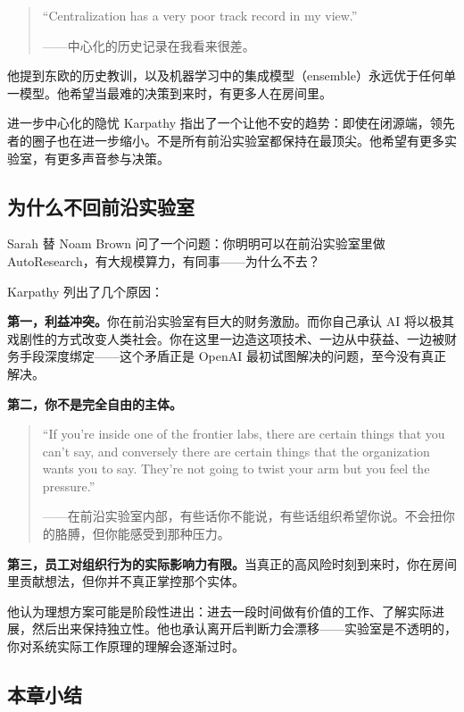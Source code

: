 \documentclass[a4paper]{article}
\begin{document}
\begin{quote}
``Centralization has a very poor track record in my view.''

——中心化的历史记录在我看来很差。
\end{quote}

他提到东欧的历史教训，以及机器学习中的集成模型（ensemble）永远优于任何单一模型。他希望当最难的决策到来时，有更多人在房间里。

\begin{warningbox}{进一步中心化的隐忧}
Karpathy 指出了一个让他不安的趋势：即使在闭源端，领先者的圈子也在进一步缩小。不是所有前沿实验室都保持在最顶尖。他希望有更多实验室，有更多声音参与决策。
\end{warningbox}

\subsection{为什么不回前沿实验室}

Sarah 替 Noam Brown 问了一个问题：你明明可以在前沿实验室里做 AutoResearch，有大规模算力，有同事——为什么不去？

Karpathy 列出了几个原因：

\textbf{第一，利益冲突。}你在前沿实验室有巨大的财务激励。而你自己承认 AI 将以极其戏剧性的方式改变人类社会。你在这里一边造这项技术、一边从中获益、一边被财务手段深度绑定——这个矛盾正是 OpenAI 最初试图解决的问题，至今没有真正解决。

\textbf{第二，你不是完全自由的主体。}

\begin{quote}
``If you're inside one of the frontier labs, there are certain things that you can't say, and conversely there are certain things that the organization wants you to say. They're not going to twist your arm but you feel the pressure.''

——在前沿实验室内部，有些话你不能说，有些话组织希望你说。不会扭你的胳膊，但你能感受到那种压力。
\end{quote}

\textbf{第三，员工对组织行为的实际影响力有限。}当真正的高风险时刻到来时，你在房间里贡献想法，但你并不真正掌控那个实体。

他认为理想方案可能是阶段性进出：进去一段时间做有价值的工作、了解实际进展，然后出来保持独立性。他也承认离开后判断力会漂移——实验室是不透明的，你对系统实际工作原理的理解会逐渐过时。

\subsection{本章小结}
\end{document}
